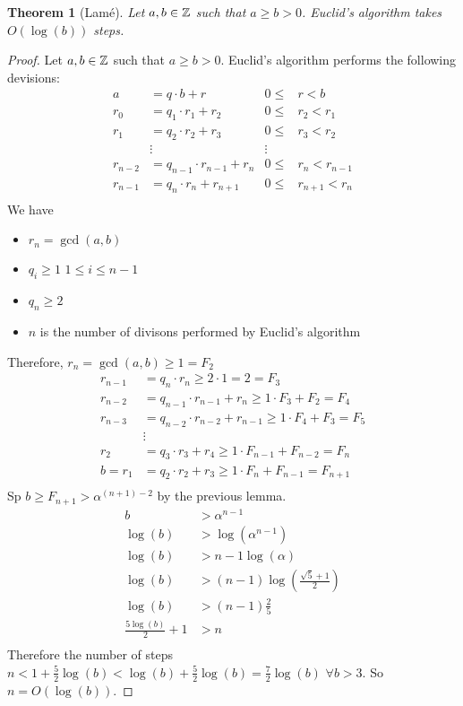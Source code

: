 \documentclass[openany]{report}
\newtheorem{theorem}{Theorem}[section]
\begin{document}
\begin{theorem}[Lam\'e]
    Let $a,b \in \mathbb{Z}$ such that $a \geq b > 0$. Euclid's algorithm takes $O(\log(b))$ steps. 
\end{theorem}
\begin{proof}
    Let $a,b \in \mathbb{Z}$ such that $a \geq b > 0$. Euclid's algorithm performs the following devisions:
    \begin{align*}
        a &= q\cdot b + r & 0 \leq& r < b\\
        r_0 &= q_1\cdot r_1 + r_2 & 0 \leq& r_2 < r_1\\
        r_1 &= q_2\cdot r_2 + r_3 & 0 \leq& r_3 < r_2\\
        &\vdots & \vdots\\
        r_{n-2} &= q_{n-1}\cdot r_{n-1} + r_n & 0 \leq& r_n < r_{n-1}\\
        r_{n-1} &= q_n\cdot r_n + r_{n+1} & 0 \leq& r_{n+1} < r_n\\
    \end{align*}
    We have 
    \begin{itemize}
        \item $r_n = \gcd(a,b)$
        \item $q_i \geq 1$ $1 \leq i \leq n-1$
        \item $q_n \geq 2$
        \item $n$ is the number of divisons performed by Euclid's algorithm
    \end{itemize}
    Therefore, $r_n = \gcd(a,b) \geq 1 = F_2$
    \begin{align*}
        r_{n-1} &= q_n \cdot r_n \geq 2 \cdot 1 = 2 = F_3\\
        r_{n-2} &= q_{n-1} \cdot r_{n-1} + r_n \geq 1 \cdot F_3 + F_2 = F_4\\
        r_{n-3} &= q_{n-2} \cdot r_{n-2} + r_{n-1} \geq 1 \cdot F_4 + F_3 = F_5\\
        &\vdots\\
        r_2 &= q_3 \cdot r_3 + r_4 \geq 1 \cdot F_{n-1} + F_{n-2} = F_n\\
        b = r_1 &= q_2 \cdot r_2 + r_3 \geq 1 \cdot F_n + F_{n-1} = F_{n+1}\\
    \end{align*}
    Sp $b \geq F_{n+1} > \alpha^{(n+1) - 2}$ by the previous lemma.
    \begin{align*}
        b &> \alpha^{n-1}\\
        \log(b) &> \log(\alpha^{n-1})\\
        \log(b) &> n-1\log(\alpha)\\
        \log(b) &> (n-1)\log\left(\frac{\sqrt{5} + 1}{2}\right)\\
        \log(b) &> (n-1)\frac{2}{5}\\
        \frac{5\log(b)}{2} + 1 &> n\\
    \end{align*}
    Therefore the number of steps $n < 1 + \frac{5}{2}\log(b) < \log(b) + \frac{5}{2}\log(b) = \frac{7}{2}\log(b)$ $\forall b > 3$. So $n = O(\log(b))$.
\end{proof}
\end{document}
